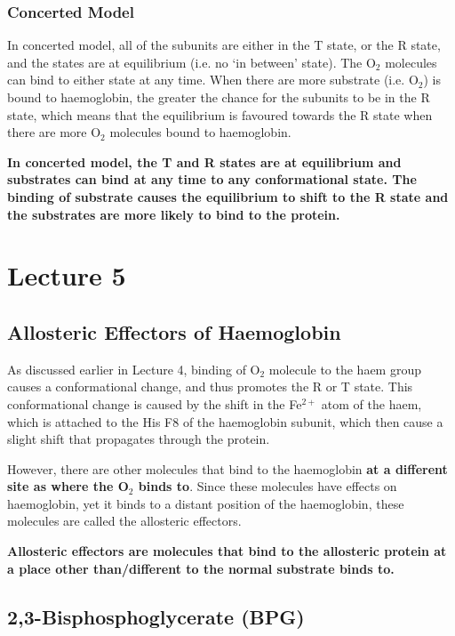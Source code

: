 \documentclass[a4paper, 12pt]{report}
\newcommand{\mychapter}[2]{
    \setcounter{chapter}{#1}
    \setcounter{section}{0}
    \chapter*{#2}
    \addcontentsline{toc}{chapter}{#2}
}
\begin{document}
\subsection{Concerted Model}

In concerted model, all of the subunits are either in the T state, or the R state, and the states are at equilibrium (i.e. no `in between' state).
The O$_2$ molecules can bind to either state at any time.
When there are more substrate (i.e. O$_2$) is bound to haemoglobin, the greater the chance for the subunits to be in the R state, which means that the equilibrium is favoured towards the R state when there are more O$_2$ molecules bound to haemoglobin.

\textbf{ In concerted model, the T and R states are at equilibrium and substrates can bind at any time to any conformational state. The binding of substrate causes the equilibrium to shift to the R state and the substrates are more likely to bind to the protein.}

\mychapter{5}{Lecture 5}

\section{Allosteric Effectors of Haemoglobin}

As discussed earlier in Lecture 4, binding of O$_2$ molecule to the haem group causes a conformational change, and thus promotes the R or T state.
This conformational change is caused by the shift in the Fe$^{2+}$ atom of the haem, which is attached to the His F8 of the haemoglobin subunit, which then cause a slight shift that propagates through the protein.

However, there are other molecules that bind to the haemoglobin \textbf{at a different site as where the O$_2$ binds to}.
Since these molecules have effects on haemoglobin, yet it binds to a distant position of the haemoglobin, these molecules are called the allosteric effectors.

\vspace{0.3cm}

\begin{center}
\textbf{Allosteric effectors are molecules that bind to the allosteric protein at a place other than/different to the normal substrate binds to.}
\end{center}

\section{2,3-Bisphosphoglycerate (BPG)}
\end{document}
